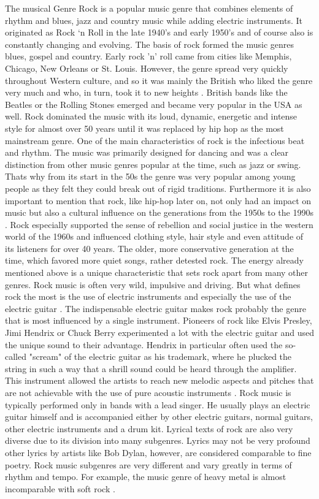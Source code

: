 The musical Genre Rock is a popular music genre that combines elements of rhythm and blues,
jazz and country music while adding electric instruments.
It originated as Rock `n Roll in the late 1940's and early 1950's and of course also is constantly
changing and evolving.
The basis of rock formed the music genres blues, gospel and country.
Early rock 'n' roll came from cities like Memphis, Chicago, New Orleans or St. Louis.
However, the genre spread very quickly throughout Western culture, and so it was mainly
the British who liked the genre very much and who, in turn, took it to new heights \cite{2021MasterclassRock}.
British bands like the Beatles or the Rolling Stones emerged and became very popular in the USA as well.
Rock dominated the music with its loud, dynamic, energetic and intense style for almost over
50 years until it was replaced by hip hop as the most mainstream genre.
One of the main characteristics of rock is the infectious beat and rhythm.
The music was primarily designed for dancing and was a clear distinction from other music genres
popular at the time, such as jazz or swing.
Thats why from its start in the 50s the genre was very popular among young people as they felt
they could break out of rigid traditions.
Furthermore it is also important to mention that rock, like hip-hop later on,
not only had an impact on music but also a cultural influence on the generations
from the 1950s to the 1990s \cite{2021MasterclassRock}. Rock especially supported the sense of rebellion and social
justice in the western world of the 1960s and influenced clothing style,
hair style and even attitude of its listeners for over 40 years.
The older, more conservative generation at the time, which favored more quiet songs,
rather detested rock.
The energy already mentioned above is a unique characteristic that sets rock apart
from many other genres. Rock music is often very wild, impulsive and driving.
But what defines rock the most is the use of electric instruments and especially
the use of the electric guitar \cite{MusicalDictRock}.
The indispensable electric guitar makes rock probably the genre that is most
influenced by a single instrument. Pioneers of rock like Elvis Presley,
Jimi Hendrix or Chuck Berry experimented a lot with the electric guitar
and used the unique sound to their advantage.
Hendrix in particular often used the so-called "scream" of the electric guitar as his trademark,
where he plucked the string in such a way that a shrill sound could be heard through the amplifier.
This instrument allowed the artists to reach new melodic aspects and pitches that are not achievable
with the use of pure acoustic instruments \cite{MusicalDictRock}. Rock music is typically performed only in bands with a lead singer.
He usually plays an electric guitar himself and is accompanied either by other electric guitars,
normal guitars, other electric instruments and a drum kit.
Lyrical texts of rock are also very diverse due to its division into many subgenres.
Lyrics may not be very profound other lyrics by artists like Bob Dylan, however,
are considered comparable to fine poetry.
Rock music subgenres are very different and vary greatly in terms of rhythm and tempo.
For example, the music genre of heavy metal is almost incomparable with soft rock \cite{Clark2021}.